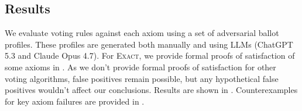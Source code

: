 \documentclass[11pt]{article}
\newcommand{\Exact}{\textsc{Exact}}
\begin{document}
\subsection{Results}
\label{sec:voting-results}

We evaluate voting rules against each axiom using a set of adversarial ballot profiles. These profiles are generated both manually and using LLMs (ChatGPT 5.3 and Claude Opus 4.7).
For \Exact{}, we provide formal proofs of satisfaction of some axioms in .
As we don't provide formal proofs of satisfaction for other voting algorithms, false positives remain possible, but any hypothetical false positives wouldn't affect our conclusions. Results are shown in . %
Counterexamples for key axiom failures are provided in .
\end{document}
